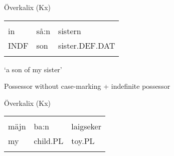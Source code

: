 \begin{listWWNumileveli}
\item 

\begin{styleExample}
Överkalix (Kx)

\end{styleExample}

\end{listWWNumileveli}

\begin{tabular}{lll}
\lsptoprule
\multicolumn{3}{l}{{\bfseries\scshape possessee}

}\\
in & så:n & sistern\\
INDF & son & sister.DEF.DAT\\
\lspbottomrule
\end{tabular}

\begin{styleTranslation}
‘a son of my sister’

\end{styleTranslation}


\begin{listWWNumxiileveli}
\item 

\begin{styleListii}
Possessor without case-marking + indefinite possessor

\end{styleListii}

\end{listWWNumxiileveli}

\begin{listWWNumileveli}
\item 

\begin{styleExample}
Överkalix (Kx)

\end{styleExample}

\end{listWWNumileveli}

\begin{tabular}{lll}
\lsptoprule
\multicolumn{3}{l}{{\bfseries\scshape possessor}

}\\
mäjn & ba:n & laigseker\\
my & child.PL & toy.PL\\
\lspbottomrule
\end{tabular}

